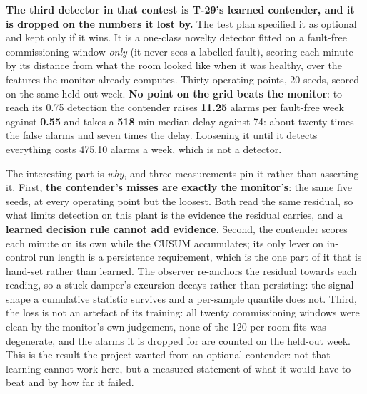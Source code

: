 \textbf{The third detector in that contest is T-29's learned contender, and it is dropped on the
numbers it lost by.} The test plan specified it as optional and kept only if it wins. It is a
one-class novelty detector fitted on a fault-free commissioning window \emph{only} (it never sees
a labelled fault), scoring each minute by its distance from what the room looked like when it was
healthy, over the features the monitor already computes. Thirty operating points, 20 seeds, scored
on the same held-out week. \textbf{No point on the grid beats the monitor}: to reach its 0.75
detection the contender raises \textbf{11.25} alarms per fault-free week against \textbf{0.55} and
takes a \textbf{518} min median delay against 74: about twenty times the false alarms and seven
times the delay. Loosening it until it detects everything costs 475.10 alarms a week, which is not a
detector.

The interesting part is \emph{why}, and three measurements pin it rather than asserting it. First,
\textbf{the contender's misses are exactly the monitor's}: the same five seeds, at every operating
point but the loosest. Both read the same residual, so what limits detection on this plant is the
evidence the residual carries, and \textbf{a learned decision rule cannot add evidence}. Second,
the contender scores each minute on its own while the CUSUM accumulates; its only lever on
in-control run length is a persistence requirement, which is the one part of it that is hand-set
rather than learned. The observer re-anchors the residual towards each reading, so a stuck damper's
excursion decays rather than persisting: the signal shape a cumulative statistic survives and a
per-sample quantile does not. Third, the loss is not an artefact of its training: all twenty
commissioning windows were clean by the monitor's own judgement, none of the 120 per-room fits was
degenerate, and the alarms it is dropped for are counted on the held-out week. This is the result
the project wanted from an optional contender: not that learning cannot work here, but a measured
statement of what it would have to beat and by how far it failed.

